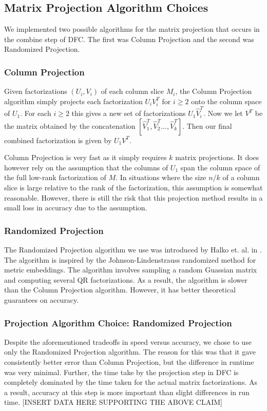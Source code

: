 \subsection{Matrix Projection Algorithm Choices}
We implemented two possible algorithms for the matrix projection that occurs in the combine step of DFC. The first was Column Projection and the second was Randomized Projection.

\subsubsection{Column Projection}
Given factorizations $(U_i,V_i)$ of each column slice $M_i$, the Column Projection algorithm simply projects each factorization $U_i V_i^T$ for $i \geq 2$ onto the column space of $U_1$. For each $i \geq 2$ this gives a new set of factorizations $U_1 \hat{V}_i^T$. Now we let $V^T$ be the  matrix obtained by the concatenation $[\hat{V}_1^T, \hat{V}_2^T..., \hat{V}_k^T]$. Then our final combined factorization is given by $U_1 V^T$.

Column Projection is very fast as it simply requires $k$ matrix projections. It does however rely on the assumption that the columns of $U_1$ span the column space of the full low-rank factorization of $M$. In situations where the size $n/k$ of a column slice is large relative to the rank of the factorization, this assumption is somewhat reasonable. However, there is still the risk that this projection method results in a small loss in accuracy due to the assumption.

\subsubsection{Randomized Projection}
The Randomized Projection algorithm we use was introduced by Halko et. al. in \cite{Halko}. The algorithm is inspired by the Johnson-Lindenstrauss randomized method for metric embeddings. The algorithm involves sampling a random Guassian matrix and computing several QR factorizations. As a result, the algorithm is slower than the Column Projection algorithm. However, it has better theoretical guarantees on accuracy.

\subsubsection{Projection Algorithm Choice: Randomized Projection}
Despite the aforementioned tradeoffs in speed versus accuracy, we chose to use only the Randomized Projection algorithm. The reason for this was that it gave consistently better error than Column Projection, but the difference in runtime was very minimal. Further, the time take by the projection step in DFC is completely dominated by the time taken for the actual matrix factorizations. As a result, accuracy at this step is more important than slight differences in run time. [INSERT DATA HERE SUPPORTING THE ABOVE CLAIM]